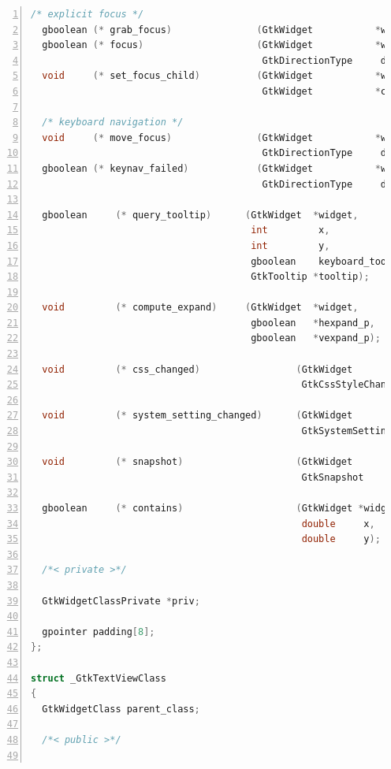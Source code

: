 \begin{lstlisting}[language=C, numbers=left]
  /* explicit focus */
  gboolean (* grab_focus)               (GtkWidget           *widget);
  gboolean (* focus)                    (GtkWidget           *widget,
                                         GtkDirectionType     direction);
  void     (* set_focus_child)          (GtkWidget           *widget,
                                         GtkWidget           *child);

  /* keyboard navigation */
  void     (* move_focus)               (GtkWidget           *widget,
                                         GtkDirectionType     direction);
  gboolean (* keynav_failed)            (GtkWidget           *widget,
                                         GtkDirectionType     direction);

  gboolean     (* query_tooltip)      (GtkWidget  *widget,
                                       int         x,
                                       int         y,
                                       gboolean    keyboard_tooltip,
                                       GtkTooltip *tooltip);

  void         (* compute_expand)     (GtkWidget  *widget,
                                       gboolean   *hexpand_p,
                                       gboolean   *vexpand_p);

  void         (* css_changed)                 (GtkWidget            *widget,
                                                GtkCssStyleChange    *change);

  void         (* system_setting_changed)      (GtkWidget            *widget,
                                                GtkSystemSetting      settings);

  void         (* snapshot)                    (GtkWidget            *widget,
                                                GtkSnapshot          *snapshot);

  gboolean     (* contains)                    (GtkWidget *widget,
                                                double     x,
                                                double     y);

  /*< private >*/

  GtkWidgetClassPrivate *priv;

  gpointer padding[8];
};

struct _GtkTextViewClass
{
  GtkWidgetClass parent_class;

  /*< public >*/


\end{lstlisting}
